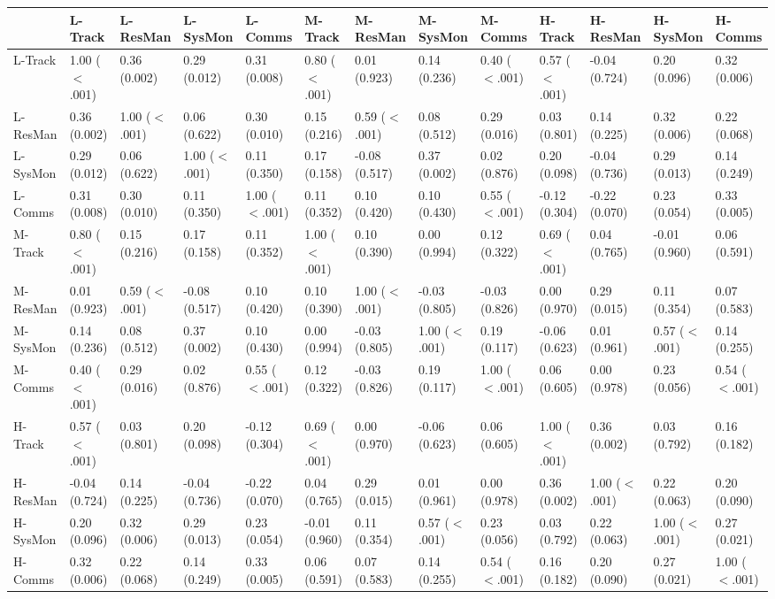 \begin{tabular}{lllllllllllll}
\toprule
 & L-Track & L-ResMan & L-SysMon & L-Comms & M-Track & M-ResMan & M-SysMon & M-Comms & H-Track & H-ResMan & H-SysMon & H-Comms \\
\midrule
L-Track & 1.00 ($<$.001) & 0.36 (0.002) & 0.29 (0.012) & 0.31 (0.008) & 0.80 ($<$.001) & 0.01 (0.923) & 0.14 (0.236) & 0.40 ($<$.001) & 0.57 ($<$.001) & -0.04 (0.724) & 0.20 (0.096) & 0.32 (0.006) \\
L-ResMan & 0.36 (0.002) & 1.00 ($<$.001) & 0.06 (0.622) & 0.30 (0.010) & 0.15 (0.216) & 0.59 ($<$.001) & 0.08 (0.512) & 0.29 (0.016) & 0.03 (0.801) & 0.14 (0.225) & 0.32 (0.006) & 0.22 (0.068) \\
L-SysMon & 0.29 (0.012) & 0.06 (0.622) & 1.00 ($<$.001) & 0.11 (0.350) & 0.17 (0.158) & -0.08 (0.517) & 0.37 (0.002) & 0.02 (0.876) & 0.20 (0.098) & -0.04 (0.736) & 0.29 (0.013) & 0.14 (0.249) \\
L-Comms & 0.31 (0.008) & 0.30 (0.010) & 0.11 (0.350) & 1.00 ($<$.001) & 0.11 (0.352) & 0.10 (0.420) & 0.10 (0.430) & 0.55 ($<$.001) & -0.12 (0.304) & -0.22 (0.070) & 0.23 (0.054) & 0.33 (0.005) \\
M-Track & 0.80 ($<$.001) & 0.15 (0.216) & 0.17 (0.158) & 0.11 (0.352) & 1.00 ($<$.001) & 0.10 (0.390) & 0.00 (0.994) & 0.12 (0.322) & 0.69 ($<$.001) & 0.04 (0.765) & -0.01 (0.960) & 0.06 (0.591) \\
M-ResMan & 0.01 (0.923) & 0.59 ($<$.001) & -0.08 (0.517) & 0.10 (0.420) & 0.10 (0.390) & 1.00 ($<$.001) & -0.03 (0.805) & -0.03 (0.826) & 0.00 (0.970) & 0.29 (0.015) & 0.11 (0.354) & 0.07 (0.583) \\
M-SysMon & 0.14 (0.236) & 0.08 (0.512) & 0.37 (0.002) & 0.10 (0.430) & 0.00 (0.994) & -0.03 (0.805) & 1.00 ($<$.001) & 0.19 (0.117) & -0.06 (0.623) & 0.01 (0.961) & 0.57 ($<$.001) & 0.14 (0.255) \\
M-Comms & 0.40 ($<$.001) & 0.29 (0.016) & 0.02 (0.876) & 0.55 ($<$.001) & 0.12 (0.322) & -0.03 (0.826) & 0.19 (0.117) & 1.00 ($<$.001) & 0.06 (0.605) & 0.00 (0.978) & 0.23 (0.056) & 0.54 ($<$.001) \\
H-Track & 0.57 ($<$.001) & 0.03 (0.801) & 0.20 (0.098) & -0.12 (0.304) & 0.69 ($<$.001) & 0.00 (0.970) & -0.06 (0.623) & 0.06 (0.605) & 1.00 ($<$.001) & 0.36 (0.002) & 0.03 (0.792) & 0.16 (0.182) \\
H-ResMan & -0.04 (0.724) & 0.14 (0.225) & -0.04 (0.736) & -0.22 (0.070) & 0.04 (0.765) & 0.29 (0.015) & 0.01 (0.961) & 0.00 (0.978) & 0.36 (0.002) & 1.00 ($<$.001) & 0.22 (0.063) & 0.20 (0.090) \\
H-SysMon & 0.20 (0.096) & 0.32 (0.006) & 0.29 (0.013) & 0.23 (0.054) & -0.01 (0.960) & 0.11 (0.354) & 0.57 ($<$.001) & 0.23 (0.056) & 0.03 (0.792) & 0.22 (0.063) & 1.00 ($<$.001) & 0.27 (0.021) \\
H-Comms & 0.32 (0.006) & 0.22 (0.068) & 0.14 (0.249) & 0.33 (0.005) & 0.06 (0.591) & 0.07 (0.583) & 0.14 (0.255) & 0.54 ($<$.001) & 0.16 (0.182) & 0.20 (0.090) & 0.27 (0.021) & 1.00 ($<$.001) \\
\bottomrule
\end{tabular}
